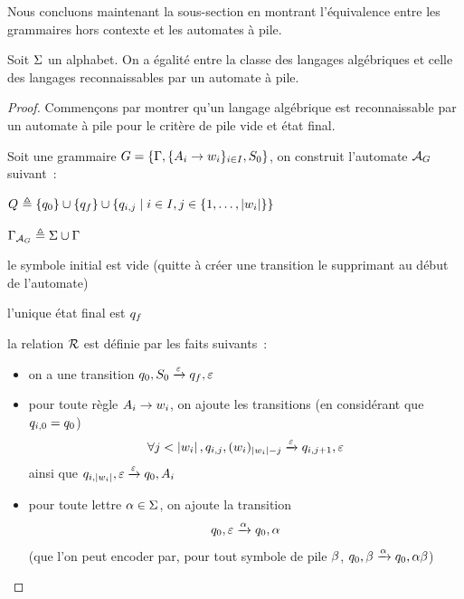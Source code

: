 Nous concluons maintenant la sous-section en montrant l'équivalence entre les
grammaires hors contexte et les automates à pile.

\begin{theorem}\label{thm.reco.alg}
  Soit $\Sigma$ un alphabet. On a égalité entre la classe des langages
  algébriques et celle des langages reconnaissables par un automate à pile.
\end{theorem}

\begin{proof}
  Commençons par montrer qu'un langage algébrique est reconnaissable par un
  automate à pile pour le critère de pile vide et état final.

  Soit une grammaire $G=\{\Gamma,\{A_i\to w_i\}_{i \in I},S_{0}\}$,
  on construit l'automate $\mathcal{A}_{G}$ suivant~:
  \begin{itemize}
    \begin{minipage}{0.65\textwidth}
    \item $Q_{} \triangleq \{q_{0}\} \cup \{q_{f}\} \cup
      \left\{ q_{i,j} \;\middle\vert\; i \in I, j \in \{1,\ldots,\left|w_i\right|\} \right\}$
    \end{minipage}
    \begin{minipage}{0.2\textwidth}
    \item $\Gamma_{\mathcal{A}_{G}} \triangleq \Sigma \cup \Gamma$
    \end{minipage}
  \item le symbole initial est vide (quitte à créer une transition le
    supprimant au début de l'automate)
  \item l'unique état final est $q_{f}$
  \item la relation $\mathrel{\mathcal{R}}$ est définie par les faits suivants~:
    \begin{itemize}
    \item on a une transition
      $q_{0},S_{0}\xrightarrow{\varepsilon} q_{f},\varepsilon$
    \item pour toute règle $A_i \to w_i$, on ajoute les transitions
      (en considérant que $q_{i,0} = q_0$)
      \[\forall j < \left|w_i\right|, q_{i,j}, (w_{i})_{\left|w_i\right|- j}
      \xrightarrow{\varepsilon} q_{i,j+1},\varepsilon\]
      ainsi que $q_{i,\left|w_i\right|},\varepsilon\xrightarrow{\varepsilon} q_{0},A_i$
    \item pour toute lettre $\alpha \in \Sigma$, on ajoute la transition
      \[q_{0},\varepsilon \xrightarrow{\alpha} q_{0},\alpha\]
      (que l'on peut encoder par, pour tout symbole de pile $\beta$,
      $q_{0},\beta\xrightarrow{\alpha} q_{0},\alpha\beta$)

\end{itemize}
\end{itemize}
\end{proof}
